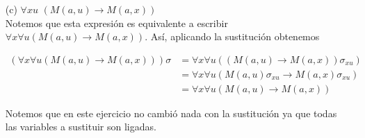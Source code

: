 \documentclass[letterpaper,11pt]{article}
\begin{document}
\begin{enumerate}
\begin{itemize}
\begin{enumerate}
\begin{itemize}
                    \item[(c)] $\forall xu$ $(M(a,u) \rightarrow M(a,x))$ \\
                    Notemos que esta expresión es equivalente a escribir 
                    $\forall x \forall u (M(a,u) \rightarrow M(a,x))$. Así, 
                    aplicando la sustitución obtenemos   
                    
                    \begin{align*}
                        (\forall x \forall u (M(a,u) 
                        \rightarrow M(a,x))) \sigma
                        &= \forall x \forall u ((M(a,u) 
                        \rightarrow M(a,x)) \sigma_{xu}) \\
                        &= \forall x \forall u (M(a,u) \sigma_{xu} 
                        \rightarrow M(a,x) \sigma_{xu}) \\
                        &= \forall x \forall u (M(a,u) \rightarrow M(a,x))
                    \end{align*}

                    Notemos que en este ejercicio no cambió nada con la 
                    sustitución ya que todas las variables a sustituir son 
                    ligadas. 
                \end{itemize}
            \end{enumerate}
        \end{itemize}
    \end{enumerate}
\end{document}

